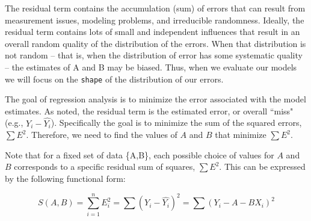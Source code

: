 \documentclass[11pt,openany]{book}\usepackage[]{graphicx}\usepackage[]{color}
\begin{document}
The residual term contains the accumulation (sum) of errors that can result from measurement issues, modeling problems, and irreducible randomness. Ideally, the residual term contains lots of small and independent influences that result in an overall random quality of the distribution of the errors. When that distribution is not random -- that is, when the distribution of error has some systematic quality -- the estimates of A and B may be biased. Thus, when we evaluate our models we will focus on the \texttt{shape} of the distribution of our errors. 

\begin{grbox}
\end{grbox}

The goal of regression analysis is to minimize the error associated with the model estimates. As noted, the residual term is the estimated error, or overall ``miss" (e.g., $Y_{i}-\hat{Y_{i}}$). Specifically the goal is to minimize the sum of the squared errors, $\sum E^{2}$. Therefore, we need to find the values of $A$ and $B$ that minimize $\sum E^{2}$. 

Note that for a fixed set of data \{A,B\}, each possible choice of values for $A$ and $B$ corresponds to a specific residual sum of squares, $\sum E^{2}$. This can be expressed by the following functional form:

\begin{equation}
 S(A,B)=\sum_{i=1}^{n} E^{2}_{i}=\sum (Y_{i}-\hat{Y_{i}})^{2}=\sum (Y_{i}-A-BX_{i})^{2}  
\end{equation}
\end{document}
